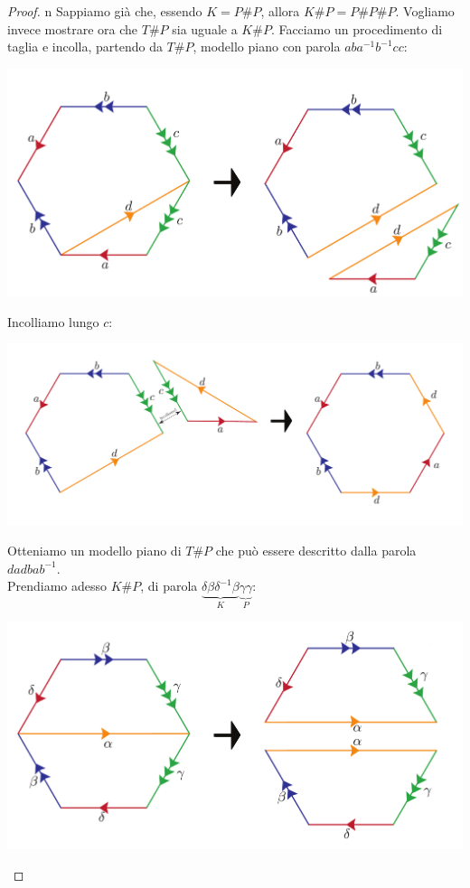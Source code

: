 \begin{proof}{n}
	Sappiamo già che, essendo $K=P\# P$, allora $K\# P=P\# P\# P$. Vogliamo invece mostrare ora che $T\# P$ sia uguale a $K\# P$. Facciamo un procedimento di taglia e incolla, partendo da $T\# P$, modello piano con parola $aba^{-1}b^{-1}cc$:
	\begin{center}
			\includegraphics[trim=0cm 0cm 0cm 0cm, clip, scale=0.3]{images/torusplusproj1.pdf}
	\end{center}
Incolliamo lungo $c$:
\begin{center}
	\includegraphics[trim=0cm 0cm 0cm 0cm, clip, scale=0.3]{images/torusplusproj2.pdf}
\end{center}
Otteniamo un modello piano di $T\# P$ che può essere descritto dalla parola $dadbab^{-1}$.\\
Prendiamo adesso $K\# P$, di parola $\underbrace{\delta\beta\delta^{-1}\beta}_{K}\underbrace{\gamma\gamma}_{P}$:
\begin{center}
	\includegraphics[trim=0cm 0cm 0cm 0cm, clip, scale=0.3]{images/kleinplusproj1.pdf}

\end{center}
\end{proof}

